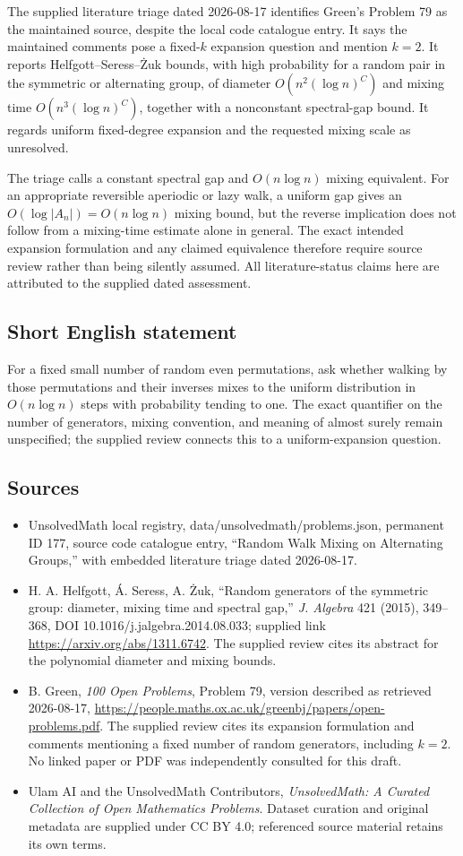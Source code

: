 \documentclass[11pt]{article}
\begin{document}
The supplied literature triage dated 2026-08-17 identifies Green's Problem 79 as the maintained source, despite the local code catalogue entry. It says the maintained comments pose a fixed-$k$ expansion question and mention $k=2$. It reports Helfgott--Seress--Żuk bounds, with high probability for a random pair in the symmetric or alternating group, of diameter $O(n^2(\log n)^C)$ and mixing time $O(n^3(\log n)^C)$, together with a nonconstant spectral-gap bound. It regards uniform fixed-degree expansion and the requested mixing scale as unresolved.

The triage calls a constant spectral gap and $O(n\log n)$ mixing equivalent. For an appropriate reversible aperiodic or lazy walk, a uniform gap gives an $O(\log|A_n|)=O(n\log n)$ mixing bound, but the reverse implication does not follow from a mixing-time estimate alone in general. The exact intended expansion formulation and any claimed equivalence therefore require source review rather than being silently assumed. All literature-status claims here are attributed to the supplied dated assessment.
\subsection{Short English statement}
For a fixed small number of random even permutations, ask whether walking by those permutations and their inverses mixes to the uniform distribution in $O(n\log n)$ steps with probability tending to one. The exact quantifier on the number of generators, mixing convention, and meaning of almost surely remain unspecified; the supplied review connects this to a uniform-expansion question.
\subsection{Sources}
\begin{itemize}
\item UnsolvedMath local registry, data/unsolvedmath/problems.json, permanent ID 177, source code catalogue entry, ``Random Walk Mixing on Alternating Groups,'' with embedded literature triage dated 2026-08-17.
\item H. A. Helfgott, Á. Seress, A. Żuk, ``Random generators of the symmetric group: diameter, mixing time and spectral gap,'' \emph{J. Algebra} 421 (2015), 349--368, DOI 10.1016/j.jalgebra.2014.08.033; supplied link \url{https://arxiv.org/abs/1311.6742}. The supplied review cites its abstract for the polynomial diameter and mixing bounds.
\item B. Green, \emph{100 Open Problems}, Problem 79, version described as retrieved 2026-08-17, \url{https://people.maths.ox.ac.uk/greenbj/papers/open-problems.pdf}. The supplied review cites its expansion formulation and comments mentioning a fixed number of random generators, including $k=2$. No linked paper or PDF was independently consulted for this draft.
\item Ulam AI and the UnsolvedMath Contributors, \emph{UnsolvedMath: A Curated Collection of Open Mathematics Problems}. Dataset curation and original metadata are supplied under CC BY 4.0; referenced source material retains its own terms.
\end{itemize}
\end{document}

